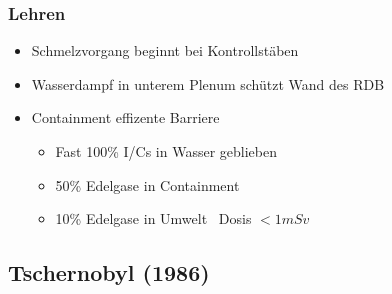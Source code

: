 \documentclass[12pt]{article}
\begin{document}
\subsubsection{Lehren}
\begin{itemize}[noitemsep]
	\item Schmelzvorgang beginnt bei Kontrollstäben
	\item Wasserdampf in unterem Plenum schützt Wand des RDB
	\item Containment effizente Barriere
		\begin{itemize}[noitemsep]
			\item Fast 100\% I/Cs in Wasser geblieben
			\item 50\% Edelgase in Containment
			\item 10\% Edelgase in Umwelt \textrightarrow\ Dosis \(<1 mSv\)
		\end{itemize}
\end{itemize}

\subsection{Tschernobyl (1986)}
\end{document}
